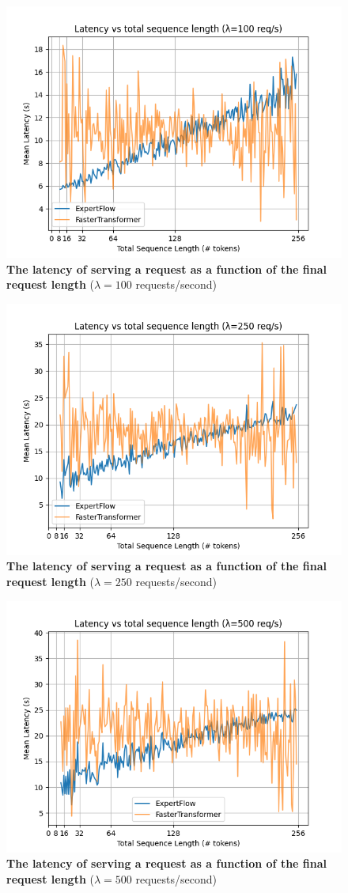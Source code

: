 \begin{figure}[H]
    \centering
    \includegraphics[width=0.6\linewidth]{figures/rate100.png}
    \caption{\textbf{The latency of serving a request as a function of the final request length} ($\lambda=100$ requests/second)}
    \label{fig:rate100}
\end{figure}

\begin{figure}[H]
    \centering
    \includegraphics[width=0.6\linewidth]{figures/rate250.png}
    \caption{\textbf{The latency of serving a request as a function of the final request length} ($\lambda=250$ requests/second)}
    \label{fig:rate250}
\end{figure}

\begin{figure}[H]
    \centering
    \includegraphics[width=0.6\linewidth]{figures/rate500.png}
    \caption{\textbf{The latency of serving a request as a function of the final request length} ($\lambda=500$ requests/second)}
    \label{fig:rate500}
\end{figure}

